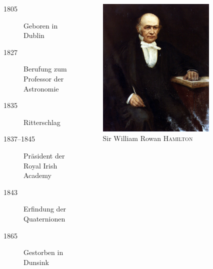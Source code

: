 \documentclass[aspectratio=169]{beamer}
\begin{document}
    \begin{frame}
        \begin{columns}
        \begin{column}{0.5\textwidth}
            \begin{description}
                \item[1805] Geboren in Dublin

                \item[1827] Berufung zum Professor der Astronomie

                \item[1835] Ritterschlag

                \item[1837--1845] Präsident der Royal Irish Academy

                \item[1843] Erfindung der Quaternionen

                \item[1865] Gestorben in Dunsink
            \end{description}
        \end{column}
        \begin{column}{0.5\textwidth}
            \begin{figure}
                \includegraphics[width=0.8\textwidth]{hamilton_portrait.jpg}
                \caption{Sir William Rowan \textsc{Hamilton} \cite{hamilton_portrait}}
            \end{figure}
        \end{column}
        \end{columns}
    \end{frame}
\end{document}

